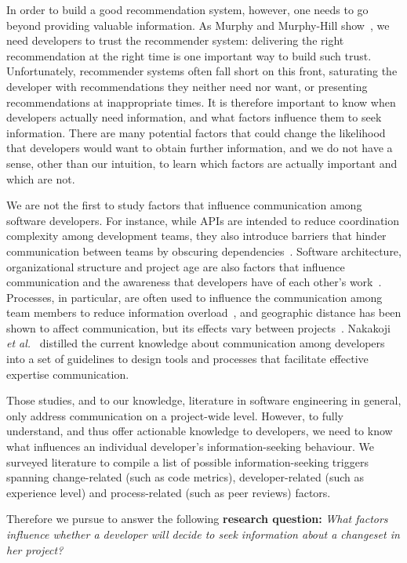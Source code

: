 \documentclass{sig-alternate}
\begin{document}
In order to build a good recommendation system, however, one needs to go beyond providing valuable information. As Murphy and Murphy-Hill show~\cite{murphy:rsse:2010}, we need developers to trust the recommender system: delivering the right recommendation at the right time is one important way to build such trust. Unfortunately, recommender systems often fall short on this front, saturating the developer with recommendations they neither need nor want, or presenting recommendations at inappropriate times. It is therefore important to know when developers actually need information, and what factors influence them to seek information. There are many potential factors that could change the likelihood that developers would want to obtain further information, and we do not have a sense, other than our intuition, to learn which factors are actually important and which are not.

We are not the first to study factors that influence communication among software developers. For instance, while APIs are intended to reduce coordination complexity among development teams, they also introduce barriers that hinder communication between teams by obscuring dependencies~\cite{desouza:cscw:2004,desouza:fse:2004}.
Software architecture, organizational structure and project age are also factors that influence communication and the awareness that developers have of each other's work~\cite{cleidson:tse:2011}. 
Processes, in particular, are often used to influence the communication among team members to reduce information overload~\cite{fussell:cscw:1998}, and geographic distance has been shown to affect communication, but its effects vary between projects~\cite{herbsleb:icse:2001,wolf:spip:2008}.
Nakakoji \emph{et al.}~\cite{nakakoji:code:2010} distilled the current knowledge about communication among developers into a set of guidelines to design tools and processes that facilitate effective expertise communication.

Those studies, and to our knowledge, literature in software engineering in general, only address communication on a project-wide level. However, to fully understand, and thus offer actionable knowledge to developers, we need to know what influences an individual developer's information-seeking behaviour.
We surveyed literature to compile a list of possible information-seeking triggers spanning change-related (such as code metrics), developer-related (such as experience level) and process-related (such as peer reviews) factors.

Therefore we pursue to answer the following \textbf{research question:}
 \emph{What factors influence whether a developer will decide to seek information about a changeset in her project?}
\end{document}
